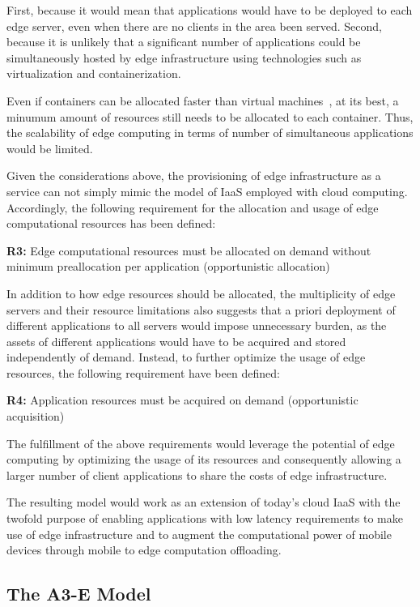 First, because it would mean that applications would have to be deployed to each edge server, even when there are no clients in the area been served. 
Second, because it is unlikely that a significant number of applications could be simultaneously hosted by edge infrastructure using technologies such as virtualization and containerization. 

Even if containers can be allocated faster than virtual machines~\cite{Giovanni}, at its best, a minumum amount of resources still needs to be allocated to each container. Thus, the scalability of edge computing in terms of number of simultaneous applications would be limited. 

Given the considerations above, the provisioning of edge infrastructure as a service can not simply mimic the model of IaaS employed with cloud computing. Accordingly, the following requirement for the allocation and usage of edge computational resources has been defined:
 
\textbf{R3:} Edge computational resources must be allocated on demand without minimum preallocation per application (opportunistic allocation) 
	
In addition to how edge resources should be allocated, the multiplicity of edge servers and their resource limitations also suggests that a priori deployment of different applications to all servers would impose unnecessary burden, as the assets of different applications would have to be acquired and stored independently of demand. Instead, to further optimize the usage of edge resources, the following requirement have been defined: 	

\textbf{R4:} Application resources must be acquired on demand (opportunistic acquisition) 


The fulfillment of the above requirements would leverage the potential of edge computing by optimizing the usage of its resources and consequently allowing a larger number of client applications to share the costs of edge infrastructure.

The resulting model would work as an extension of today’s cloud IaaS with the twofold purpose of enabling applications with low latency requirements to make use of edge infrastructure and to augment the computational power of mobile devices through mobile to edge computation offloading. 

\subsection{The A3-E Model}

